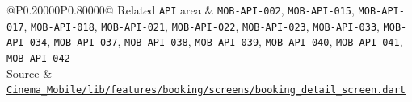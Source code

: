 \begin{longtable}{@{}P{0.20000\SRSWidth}P{0.80000\SRSWidth}@{}}
Related \texttt{API} area & \texttt{MOB-\allowbreak{}API-\allowbreak{}002}, \texttt{MOB-\allowbreak{}API-\allowbreak{}015}, \texttt{MOB-\allowbreak{}API-\allowbreak{}017}, \texttt{MOB-\allowbreak{}API-\allowbreak{}018}, \texttt{MOB-\allowbreak{}API-\allowbreak{}021}, \texttt{MOB-\allowbreak{}API-\allowbreak{}022}, \texttt{MOB-\allowbreak{}API-\allowbreak{}023}, \texttt{MOB-\allowbreak{}API-\allowbreak{}033}, \texttt{MOB-\allowbreak{}API-\allowbreak{}034}, \texttt{MOB-\allowbreak{}API-\allowbreak{}037}, \texttt{MOB-\allowbreak{}API-\allowbreak{}038}, \texttt{MOB-\allowbreak{}API-\allowbreak{}039}, \texttt{MOB-\allowbreak{}API-\allowbreak{}040}, \texttt{MOB-\allowbreak{}API-\allowbreak{}041}, \texttt{MOB-\allowbreak{}API-\allowbreak{}042} \\[3pt]
Source & \href{../../../Cinema\_Mobile/lib/features/booking/screens/booking\_detail\_screen.dart}{\texttt{Cinema\_\allowbreak{}Mobile/\allowbreak{}lib/\allowbreak{}features\allowbreak{}/\allowbreak{}booking/\allowbreak{}screens/\allowbreak{}booking\_\allowbreak{}detail\_\allowbreak{}screen.\allowbreak{}dart}} \\[3pt]
\end{longtable}
\endgroup

